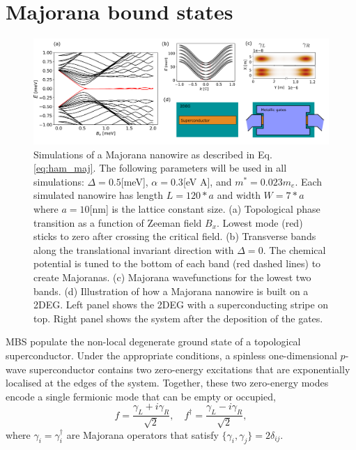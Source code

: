 \section{Majorana bound states}

\begin{figure}[h!!]
\centering
  \includegraphics[width=0.95\linewidth]{figures/majorana_intro.pdf}
  \caption{Simulations of a Majorana nanowire as described in Eq. \eqref{eq:ham_maj}. The following parameters will be used in all simulations:  $\Delta=0.5$[meV], $\alpha=0.3$[eV A], and $m^*=0.023 m_e$. Each simulated nanowire has length $L=120*a$ and width $W=7*a$ where $a=10$[nm] is the lattice constant size. (a) Topological phase transition as a function of Zeeman field $B_x$. Lowest mode (red) sticks to zero after crossing the critical field. (b)  Transverse bands along the translational invariant direction with $\Delta=0$. The chemical potential is tuned to the bottom of each band (red dashed lines) to create Majoranas. (c) Majorana wavefunctions for the lowest two bands. (d) Illustration of how a Majorana nanowire is built on a 2DEG. Left panel shows the 2DEG with a superconducting stripe on top. Right panel shows the system after the deposition of the gates.}
  \label{fig:intro}
\end{figure}

MBS populate the non-local degenerate ground state of a topological superconductor\cite{Alicea2011}.
Under the appropriate conditions, a spinless one-dimensional $p$-wave superconductor contains two zero-energy excitations that are exponentially localised at the edges of the system. 
Together, these two zero-energy modes encode a single fermionic mode that can be empty or occupied, 
\begin{equation}
f = \frac{\gamma_{L} + i\gamma_{R}}{\sqrt{2}}, \quad f^{\dagger} = \frac{\gamma_{L} - i \gamma_{R}}{\sqrt{2}},
\end{equation}
where $\gamma_{i} = \gamma_{i}^{\dagger}$ are Majorana operators that satisfy $\{ \gamma_{i}, \gamma_{j} \} = 2\delta_{ij}$.

